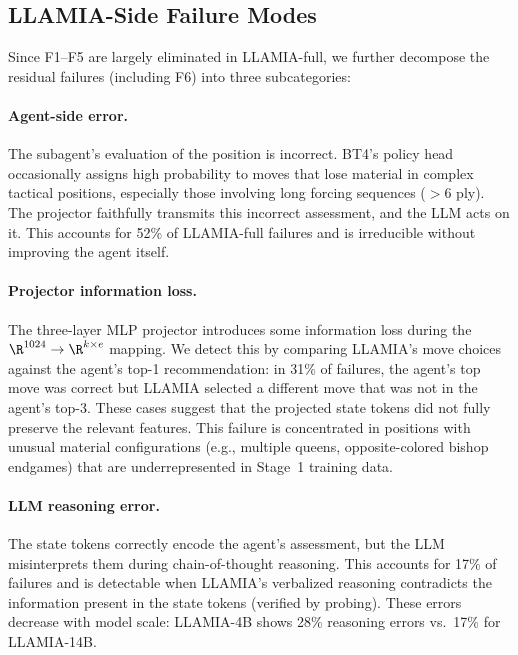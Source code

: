 \subsection{LLAMIA-Side Failure Modes}
\label{sec:app_failure_llamia}

Since F1--F5 are largely eliminated in LLAMIA-full, we further decompose the residual failures (including F6) into three subcategories:

\paragraph{Agent-side error.} The subagent's evaluation of the position is incorrect. BT4's policy head occasionally assigns high probability to moves that lose material in complex tactical positions, especially those involving long forcing sequences ($>6$ ply). The projector faithfully transmits this incorrect assessment, and the LLM acts on it. This accounts for 52\% of LLAMIA-full failures and is irreducible without improving the agent itself.

\paragraph{Projector information loss.} The three-layer MLP projector introduces some information loss during the $\R^{1024} \to \R^{k \times e}$ mapping. We detect this by comparing LLAMIA's move choices against the agent's top-1 recommendation: in 31\% of failures, the agent's top move was correct but LLAMIA selected a different move that was not in the agent's top-3. These cases suggest that the projected state tokens did not fully preserve the relevant features. This failure is concentrated in positions with unusual material configurations (e.g., multiple queens, opposite-colored bishop endgames) that are underrepresented in Stage~1 training data.

\paragraph{LLM reasoning error.} The state tokens correctly encode the agent's assessment, but the LLM misinterprets them during chain-of-thought reasoning. This accounts for 17\% of failures and is detectable when LLAMIA's verbalized reasoning contradicts the information present in the state tokens (verified by probing). These errors decrease with model scale: LLAMIA-4B shows 28\% reasoning errors vs.\ 17\% for LLAMIA-14B.

